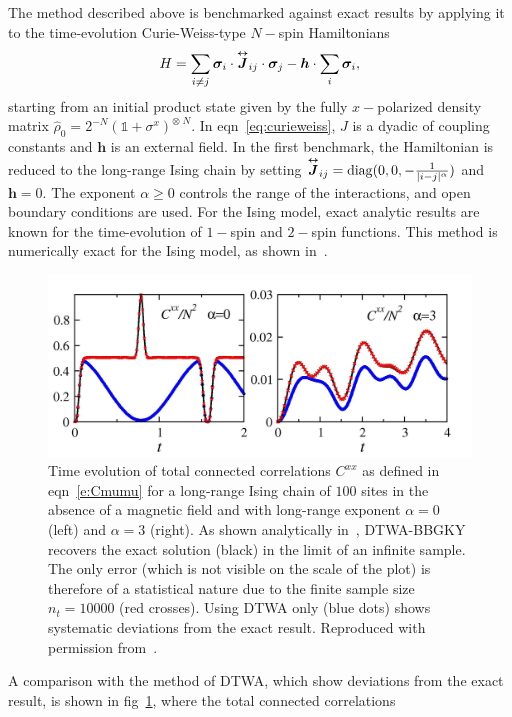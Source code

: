 \documentclass[extendedabs]{bmvc2k}
\DeclarePairedDelimiter{\diagfences}{(}{)}
\newcommand{\diag}{\operatorname{diag}\diagfences}
\begin{document}
The method described above is benchmarked against exact results by applying it to the time-evolution Curie-Weiss-type $N-$spin Hamiltonians
\begin{equation}
\label{eq:curieweiss}
H = \sum_{i\neq j}\bm{\sigma}_i\cdot\overset{\text{\tiny$\bm\leftrightarrow$}}{\bm{J}}_{ij}\cdot\bm{\sigma}_j - \bm{h}\cdot\sum_i \bm{\sigma}_i,
\end{equation}
starting from an initial product state given by the fully $x-$polarized density matrix $\hat{\rho}_0 = 2^{-N}(\mathbb{1}+\sigma^x)^{\otimes\;N}$. In eqn~\ref{eq:curieweiss}, $J$ is a dyadic of coupling constants and $\bm{h}$ is an external field. In the first benchmark, the Hamiltonian is reduced to the long-range Ising chain by setting $\overset{\text{\tiny$\bm\leftrightarrow$}}{\bm{J}}_{ij} =\diag{0,0,-\frac{1}{|i-j|^\alpha}}$ and $\bm{h} = 0$. The exponent $\alpha\geq0$ controls the range of the interactions, and open boundary conditions are used. For the Ising model, exact analytic results are known for the time-evolution of $1-$spin and $2-$spin functions. This method is numerically exact for the Ising model, as shown in~\cite{Pucci16}. 
\begin{figure}\centering
\includegraphics[width=\linewidth]{./images/fig2.jpg}
\caption{\label{f:Ising}%
Time evolution of total connected correlations $C^{xx}$ as defined in eqn~\eqref{e:Cmumu} for a long-range Ising chain of $100$ sites in the absence of a magnetic field and with long-range exponent $\alpha=0$ (left) and $\alpha=3$ (right). As shown analytically in~\cite{Pucci16}, DTWA-BBGKY recovers the exact solution (black) in the limit of an infinite sample. The only error (which is not visible on the scale of the plot) is therefore of a statistical nature due to the finite sample size $n_t=10000$ (red crosses). Using DTWA only (blue dots) shows systematic deviations from the exact result. Reproduced with permission from~\cite{Pucci16}.}%
\end{figure}
A comparison with the method of DTWA, which show deviations from the exact result, is shown in fig~\ref{f:Ising}, where the total connected correlations
\end{document}
